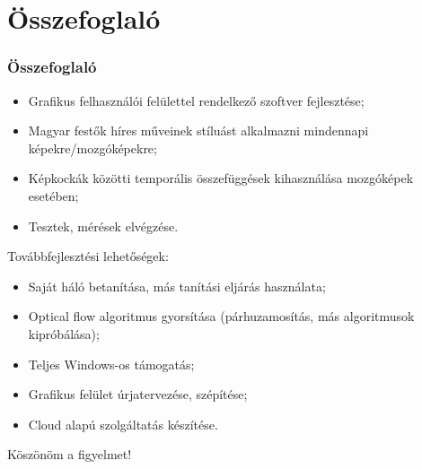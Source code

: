 \documentclass{beamer}
\begin{document}
	\section{Összefoglaló}
	
	\begin{frame}
		\frametitle{Összefoglaló}
		\begin{itemize}
			\item Grafikus felhasználói felülettel rendelkező szoftver fejlesztése;
			\item Magyar festők híres műveinek stíluást alkalmazni mindennapi képekre/mozgóképekre;
			\item Képkockák közötti temporális összefüggések kihasználása mozgóképek esetében;
			\item Tesztek, mérések elvégzése.
		\end{itemize}
		
		\vspace{0.5cm}
		Továbbfejlesztési lehetőségek:
		\begin{itemize}
			\item Saját háló betanítása, más tanítási eljárás használata;
			\item Optical flow algoritmus gyorsítása (párhuzamosítás, más algoritmusok kipróbálása);
			\item Teljes Windows-os támogatás;
			\item Grafikus felület úrjatervezése, szépítése;
			\item Cloud alapú szolgáltatás készítése.
		\end{itemize}
		\vspace{0.5cm}
		\begin{center}
			Köszönöm a figyelmet!
		\end{center}
	\end{frame}
	
	
\end{document}
